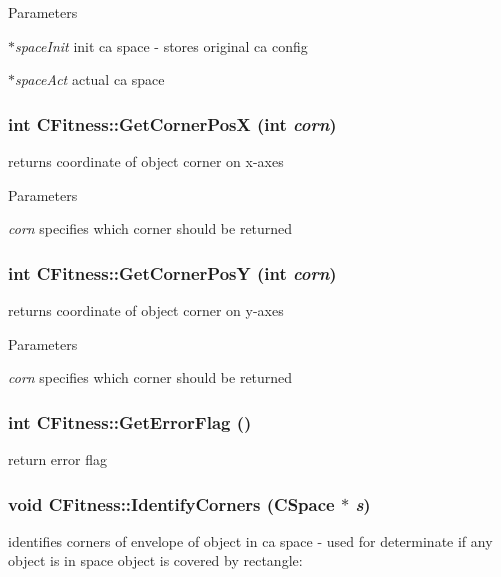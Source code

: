\begin{DoxyParams}{Parameters}
\item[{\em $\ast$spaceInit}]init ca space -\/ stores original ca config \item[{\em $\ast$spaceAct}]actual ca space \end{DoxyParams}
\hypertarget{classCFitness_aad8f7c73a77d92e961675974d1547be1}{
\subsubsection[{GetCornerPosX}]{\setlength{\rightskip}{0pt plus 5cm}int CFitness::GetCornerPosX (int {\em corn})}}
\label{classCFitness_aad8f7c73a77d92e961675974d1547be1}
returns coordinate of object corner on x-\/axes


\begin{DoxyParams}{Parameters}
\item[{\em corn}]specifies which corner should be returned \end{DoxyParams}
\hypertarget{classCFitness_af6cce0883c44254ff4f99ac82c657702}{
\subsubsection[{GetCornerPosY}]{\setlength{\rightskip}{0pt plus 5cm}int CFitness::GetCornerPosY (int {\em corn})}}
\label{classCFitness_af6cce0883c44254ff4f99ac82c657702}
returns coordinate of object corner on y-\/axes


\begin{DoxyParams}{Parameters}
\item[{\em corn}]specifies which corner should be returned \end{DoxyParams}
\hypertarget{classCFitness_ae1b8b88c462be88750ee3ac66050f00d}{
\subsubsection[{GetErrorFlag}]{\setlength{\rightskip}{0pt plus 5cm}int CFitness::GetErrorFlag ()}}
\label{classCFitness_ae1b8b88c462be88750ee3ac66050f00d}
return error flag \hypertarget{classCFitness_ab47bde2acae9b2cf350b3f0f30c1848e}{
\subsubsection[{IdentifyCorners}]{\setlength{\rightskip}{0pt plus 5cm}void CFitness::IdentifyCorners ({\bf CSpace} $\ast$ {\em s})}}
\label{classCFitness_ab47bde2acae9b2cf350b3f0f30c1848e}
identifies corners of envelope of object in ca space -\/ used for determinate if any object is in space object is covered by rectangle:

